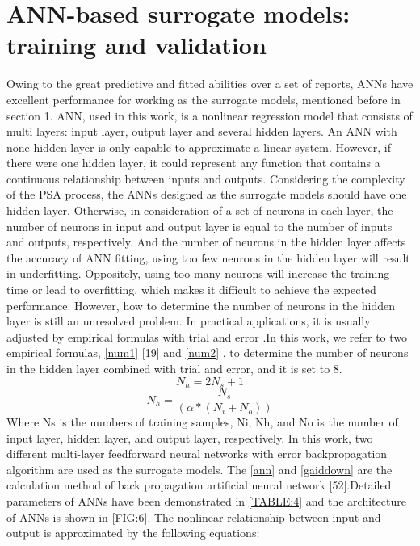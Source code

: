 \documentclass[preprint,12pt]{elsarticle}
\begin{document}
\section{ANN-based surrogate models: training and validation}
Owing to the great predictive and fitted abilities over a set of reports, ANNs have excellent performance for working as the surrogate models, mentioned before in section 1. ANN, used in this work, is a nonlinear regression model that consists of multi layers: input layer, output layer and several hidden layers. An ANN with none hidden layer is only capable to approximate a linear system. However, if there were one hidden layer, it could represent any function that contains a continuous relationship between inputs and outputs. Considering the complexity of the PSA process, the ANNs designed as the surrogate models should have one hidden layer. Otherwise, in consideration of a set of neurons in each layer, the number of neurons in input and output layer is equal to the number of inputs and outputs, respectively. And the number of neurons in the hidden layer affects the accuracy of ANN fitting, using too few neurons in the hidden layer will result in underfitting. Oppositely, using too many neurons will increase the training time or lead to overfitting, which makes it difficult to achieve the expected performance. However, how to determine the number of neurons in the hidden layer is still an unresolved problem. In practical applications, it is usually adjusted by empirical formulas with trial and error \cite{RN52}.In this work, we refer to two empirical formulas, \cref{num1} [19] and \cref{num2} \cite{RN53}, to determine the number of neurons in the hidden layer combined with trial and error, and it is set to 8.
\begin{equation}
	{N_h} = 2{N_s} + 1\label{num1}
\end{equation}
\begin{equation}
	{N_h} = \frac{{{N_s}}}{{\left( {\alpha  * \left( {{N_i} + {N_o}} \right)} \right)}}\label{num2}
\end{equation}
Where Ns is the numbers of training samples, Ni, Nh, and No is the number of input layer, hidden layer, and output layer, respectively.
In this work, two different multi-layer feedforward neural networks with error backpropagation algorithm are used as the surrogate models. The \cref{ann} and \cref{gaiddown} are the calculation method of back propagation artificial neural network [52].Detailed parameters of ANNs have been demonstrated in \cref{TABLE:4} and the architecture of ANNs is shown in \cref{FIG:6}. The nonlinear relationship between input and output is approximated by the following equations:
\end{document}
